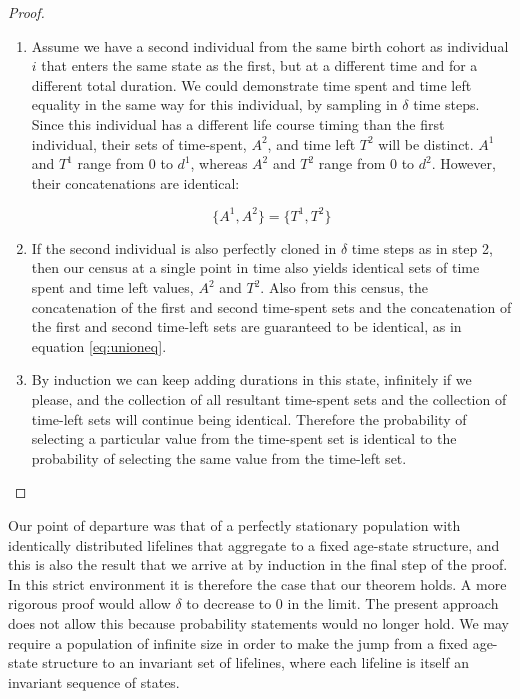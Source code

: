 \documentclass[12pt,oneside,a4paper]{article} %
\theoremstyle{definition}
\begin{document}
\begin{proof}
\begin{enumerate}
\FloatBarrier
\item{} Assume we have a second individual from the same birth cohort as
individual $i$ that enters the same state as the first, but at a different time
and for a different total duration. We could demonstrate time spent and time left equality in the same
way for this individual, by sampling in $\delta$ time steps. Since
this individual has a different life course timing than the first individual, their
sets of time-spent, $A^2$, and time left $T^2$ will be distinct. $A^1$ and $T^1$ range from 0 to $d^1$, whereas $A^2$ and $T^2$
range from 0 to $d^2$. However, their concatenations are identical:

\begin{equation}
\label{eq:unioneq}
\{A^1 , A^2\} = \{T^1 , T^2\}
\end{equation}

\item{} If the second individual is also perfectly cloned in $\delta$ time
steps as in step 2, then our census at a single point in time also
yields identical sets of time spent and time left values, $A^2$ and $T^2$. Also
from this census, the concatenation of the first and second time-spent sets and the concatenation of the first and second time-left sets
are guaranteed to be identical, as in equation \eqref{eq:unioneq}. 

\item{} By induction we can keep adding durations in this state, infinitely if we
please, and the collection of all resultant time-spent sets and the collection
of time-left sets will continue being identical. Therefore the probability of selecting a particular value from the time-spent set is identical
to the probability of selecting the same value from the time-left set. 
\end{enumerate}
\end{proof}

Our point of departure was that of a perfectly stationary population with
identically distributed lifelines that aggregate to a fixed age-state structure,
and this is also the result that we arrive at by induction in the final step of
the proof. In this strict environment it is therefore the case that our theorem
holds. A more rigorous proof would allow $\delta$ to decrease to 0 in the
limit. The present approach does not allow this because probability statements
would no longer hold. We may require a population of infinite size in order to
make the jump from a fixed age-state structure to an invariant set of lifelines,
where each lifeline is itself an invariant sequence of states. 
\end{document}
